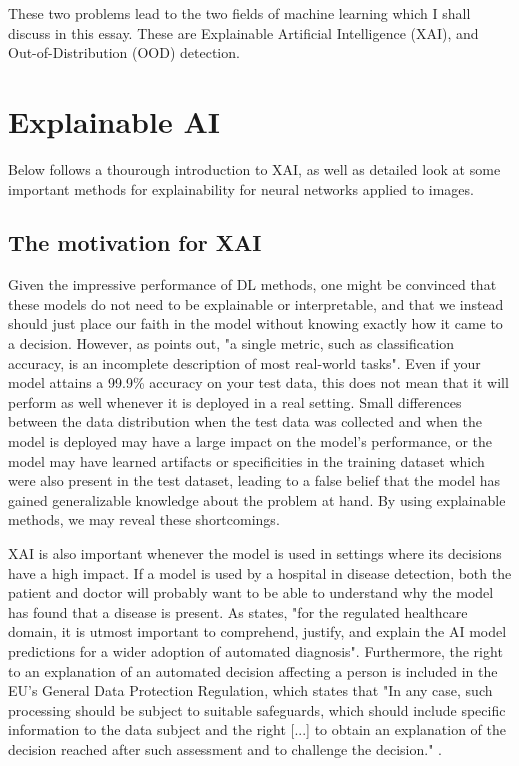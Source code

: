 \documentclass[conference]{IEEEtran}
\begin{document}
These two problems lead to the two fields of machine learning which I shall discuss in this essay. These are Explainable Artificial Intelligence (XAI), and Out-of-Distribution (OOD) detection.

\section{Explainable AI}

Below follows a thourough introduction to XAI, as well as detailed look at some important methods for explainability for neural networks applied to images.

\subsection{The motivation for XAI}

Given the impressive performance of DL methods, one might be convinced that these models do not need to be explainable or interpretable, and that we instead should just place our faith in the model without knowing exactly how it came to a decision. However, as \cite{doshivelez} points out, "a single metric, such as classification accuracy, is an incomplete description of most real-world tasks". Even if your model attains a 99.9\% accuracy on your test data, this does not mean that it will perform as well whenever it is deployed in a real setting. Small differences between the data distribution when the test data was collected and when the model is deployed may have a large impact on the model's performance, or the model may have learned artifacts or specificities in the training dataset which were also present in the test dataset, leading to a false belief that the model has gained generalizable knowledge about the problem at hand. By using explainable methods, we may reveal these shortcomings.

XAI is also important whenever the model is used in settings where its decisions have a high impact. If a model is used by a hospital in disease detection, both the patient and doctor will probably want to be able to understand why the model has found that a disease is present. As \cite{xaioverview} states, "for the regulated healthcare domain, it is utmost important to comprehend, justify, and explain the AI model predictions for a wider adoption of automated diagnosis". Furthermore, the right to an explanation of an automated decision affecting a person is included in the EU's General Data Protection Regulation, which states that "In any case, such processing should be subject to suitable safeguards, which should include specific information to the data subject and the right [...] to obtain an explanation of the decision reached after such assessment and to challenge the decision." \cite{gdpr}.
\end{document}
